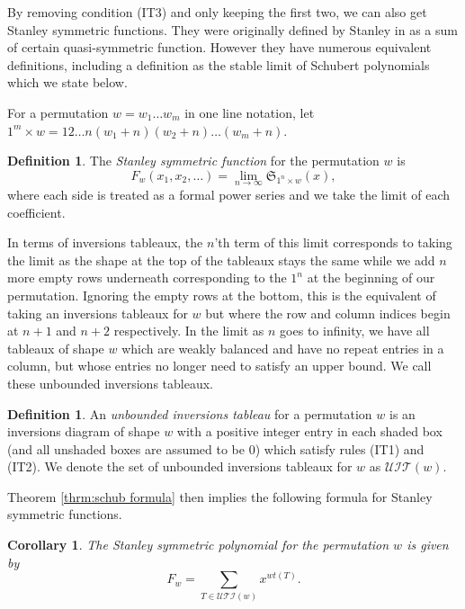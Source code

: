 \documentclass{article}
\newtheorem{corollary}[theorem]{Corollary}
\theoremstyle{definition}
\newtheorem{definition}[theorem]{Definition} %
\begin{document}
By removing condition (IT3) and only keeping the first two, we can also get Stanley symmetric functions. They were originally defined by Stanley in \cite{stanleysymmetric} as a sum of certain quasi-symmetric function. However they have numerous equivalent definitions, including a definition as the stable limit of Schubert polynomials which we state below.

For a permutation $w = w_1 \dots w_m$ in one line notation, let $1^m \times w = 12\dots n (w_1+n) (w_2+n) \dots (w_m+n)$.

\begin{definition}
    The \emph{Stanley symmetric function} for the permutation $w$ is
    \[ F_w(x_1, x_2, \dots ) = \lim_{n\to\infty} \mathfrak{S}_{1^n \times w} (x), \]
    where each side is treated as a formal power series and we take the limit of each coefficient.
\end{definition}

In terms of inversions tableaux, the $n$'th term of this  limit corresponds to taking the limit as the shape at the top of the tableaux stays the same while we add $n$ more empty rows underneath corresponding to the $1^n$ at the beginning of our permutation. Ignoring the empty rows at the bottom, this is the equivalent of taking an inversions tableaux for $w$ but where the row and column indices begin at $n+1$ and $n+2$ respectively. In the limit as $n$ goes to infinity, we have all tableaux of shape $w$ which are weakly balanced and have no repeat entries in a column, but whose entries no longer need to satisfy an upper bound. We call these unbounded inversions tableaux.

\begin{definition}
    An \emph{unbounded inversions tableau} for a permutation $w$ is an inversions diagram of shape $w$ with a positive integer entry in each shaded box (and all unshaded boxes are assumed to be 0) which satisfy rules (IT1) and (IT2). We denote the set of unbounded inversions tableaux for $w$ as $\mathcal{UIT}(w)$.
\end{definition}

Theorem \ref{thrm:schub formula} then implies the following formula for Stanley symmetric functions.

\begin{corollary}
    The Stanley symmetric polynomial for the permutation $w$ is given by 
    $$F_w = \sum\limits_{T \in \mathcal{UTI}(w)} x^{wt(T)}.$$
\end{corollary}
\end{document}
